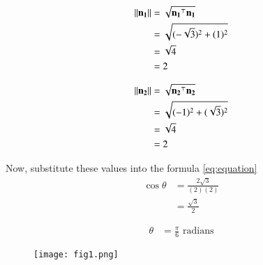 \documentclass[journal]{IEEEtran}
\begin{document}
\begin{align}
\left\lVert\mathbf{n_1}\right\rVert &= \sqrt{\mathbf{n_1}^\top\mathbf{n_1}}\\
&= \sqrt{(-\sqrt{3})^2 + (1)^2} \\
&= \sqrt{4} \\
&= 2
\end{align}

\begin{align}
\left\lVert\mathbf{n_2}\right\rVert &= \sqrt{\mathbf{n_2}^\top\mathbf{n_2}}\\
&= \sqrt{(-1)^2 + (\sqrt{3})^2} \\
&= \sqrt{4} \\
&= 2
\end{align}

Now, substitute these values into the formula \eqref{eq:equation}
\begin{align}
\cos \theta &= \frac{2\sqrt{3}}{(2)(2)} \\
&= \frac{\sqrt{3}}{2}
\end{align}

\begin{align}
\theta &= \frac{\pi}{6} \text{ radians}
\end{align}


\begin{figure}[H]
\centering
\texttt{[image: fig1.png]}
\caption{}
\label{fig:1}
\end{figure}
\end{document}
